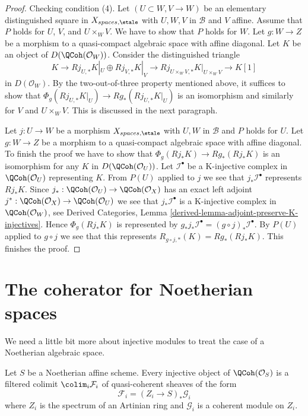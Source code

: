 \begin{proof}
\medskip\noindent
Checking condition (4).
Let $(U \subset W, V \to W)$ be an elementary distinguished square
in $X_{spaces, \etale}$ with $U, W, V$ in $\mathcal{B}$ and $V$ affine.
Assume that $P$ holds for $U$, $V$, and $U \times_W V$.
We have to show that $P$ holds for $W$. Let $g : W \to Z$
be a morphism to a quasi-compact algebraic space with affine diagonal.
Let $K$ be an object of $D(\QCoh(\mathcal{O}_W))$.
Consider the distinguished triangle
$$
K \to Rj_{U, *}K|_U \oplus Rj_{V, *}K|_V \to
Rj_{U \times_W V, *}K|_{U \times_W V} \to K[1]
$$
in $D(\mathcal{O}_W)$. By the two-out-of-three property mentioned
above, it suffices to show that $\Phi_g(Rj_{U, *}K|_U) \to Rg_*(Rj_{U, *}K|_U)$
is an isomorphism and similarly for $V$ and $U \times_W V$.
This is discussed in the next paragraph.

\medskip\noindent
Let $j : U \to W$ be a morphism $X_{spaces, \etale}$ with
$U, W$ in $\mathcal{B}$ and $P$ holds for $U$. Let $g : W \to Z$
be a morphism to a quasi-compact algebraic space with affine diagonal.
To finish the proof we have to show that
$\Phi_g(Rj_*K) \to Rg_*(Rj_*K)$
is an isomorphism for any $K$ in $D(\QCoh(\mathcal{O}_U))$.
Let $\mathcal{I}^\bullet$ be a K-injective complex in $\QCoh(\mathcal{O}_U)$
representing $K$.
From $P(U)$ applied to $j$ we see that
$j_*\mathcal{I}^\bullet$ represents $Rj_*K$.
Since $j_* : \QCoh(\mathcal{O}_U) \to \QCoh(\mathcal{O}_X)$
has an exact left adjoint
$j^* : \QCoh(\mathcal{O}_X) \to \QCoh(\mathcal{O}_U)$
we see that $j_*\mathcal{I}^\bullet$ is a K-injective complex
in $\QCoh(\mathcal{O}_W)$, see
Derived Categories, Lemma \ref{derived-lemma-adjoint-preserve-K-injectives}.
Hence $\Phi_g(Rj_*K)$ is represented by
$g_*j_*\mathcal{I}^\bullet = (g \circ j)_*\mathcal{I}^\bullet$.
By $P(U)$ applied to $g \circ j$ we see that this represents
$R_{g \circ j, *}(K) = Rg_*(Rj_*K)$. This finishes the proof.
\end{proof}









\section{The coherator for Noetherian spaces}
\label{section-coherator-Noetherian}

\noindent
We need a little bit more about injective modules to treat the case
of a Noetherian algebraic space.

\begin{lemma}
\label{lemma-affine-injective-colimit-direct-sum-pushforwards-artin}
Let $S$ be a Noetherian affine scheme. Every injective object of
$\QCoh(\mathcal{O}_S)$ is a filtered colimit $\colim_i \mathcal{F}_i$
of quasi-coherent sheaves of the form
$$
\mathcal{F}_i = (Z_i \to S)_*\mathcal{G}_i
$$
where $Z_i$ is the spectrum of an Artinian ring and $\mathcal{G}_i$
is a coherent module on $Z_i$.
\end{lemma}

